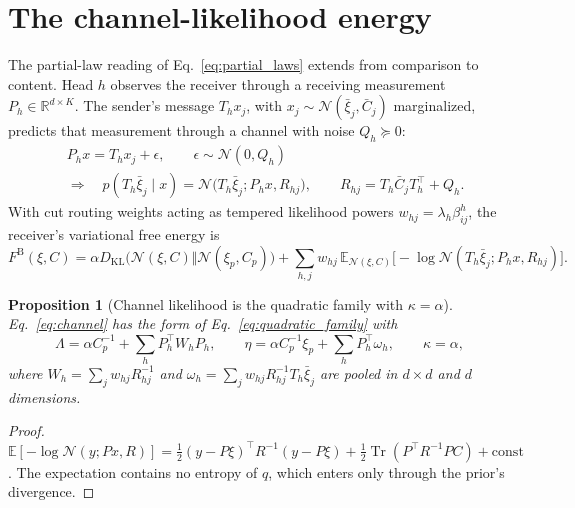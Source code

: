 \documentclass[11pt]{article}
\newtheorem{proposition}{Proposition}
\theoremstyle{definition}
\theoremstyle{remark}
\newcommand{\KL}{D_{\mathrm{KL}}}
\newcommand{\Tr}{\operatorname{Tr}}
\newcommand{\E}{\mathbb{E}}
\newcommand{\N}{\mathcal{N}}
\begin{document}
\section{The channel-likelihood energy}
\label{sec:channel}

The partial-law reading of Eq.~\eqref{eq:partial_laws} extends from comparison to content. Head $h$ observes the receiver through a receiving measurement $P_h\in\mathbb R^{d\times K}$. The sender's message $T_hx_j$, with $x_j\sim\N(\bar\xi_j,\bar C_j)$ marginalized, predicts that measurement through a channel with noise $Q_h\succeq0$:
\begin{equation}
\begin{split}
&P_hx=T_hx_j+\epsilon,\qquad \epsilon\sim\N(0,Q_h)\\
&\Longrightarrow\quad
p(T_h\bar\xi_j\mid x)=\N\bigl(T_h\bar\xi_j;P_hx,R_{hj}\bigr),\qquad R_{hj}=T_h\bar C_jT_h^\top+Q_h.
\end{split}
\label{eq:channel_model}
\end{equation}
With cut routing weights acting as tempered likelihood powers $w_{hj}=\lambda_h\beta_{ij}^h$, the receiver's variational free energy is
\begin{equation}
F^{\mathrm B}(\xi,C)=\alpha\KL\bigl(\N(\xi,C)\Vert\N(\xi_p,C_p)\bigr)+\sum_{h,j}w_{hj}\,\E_{\N(\xi,C)}\bigl[-\log\N(T_h\bar\xi_j;P_hx,R_{hj})\bigr].
\label{eq:channel}
\end{equation}

\begin{proposition}[Channel likelihood is the quadratic family with $\kappa=\alpha$]
\label{prop:channel}
Eq.~\eqref{eq:channel} has the form of Eq.~\eqref{eq:quadratic_family} with
\begin{equation}
\Lambda=\alpha C_p^{-1}+\sum_hP_h^\top W_hP_h,\qquad
\eta=\alpha C_p^{-1}\xi_p+\sum_hP_h^\top\omega_h,\qquad
\kappa=\alpha,
\label{eq:channel_stats}
\end{equation}
where $W_h=\sum_jw_{hj}R_{hj}^{-1}$ and $\omega_h=\sum_jw_{hj}R_{hj}^{-1}T_h\bar\xi_j$ are pooled in $d\times d$ and $d$ dimensions.
\end{proposition}

\begin{proof}
$\E[-\log\N(y;Px,R)]=\tfrac12(y-P\xi)^\top R^{-1}(y-P\xi)+\tfrac12\Tr(P^\top R^{-1}PC)+\text{const}$. The expectation contains no entropy of $q$, which enters only through the prior's divergence.
\end{proof}
\end{document}
